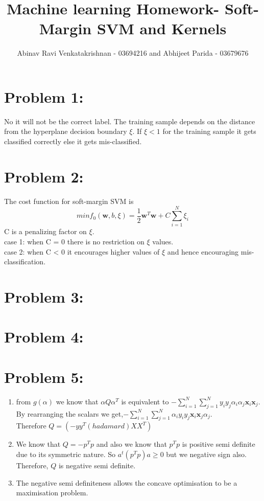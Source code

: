 \documentclass[5pt,a4paper]{article}
\begin{document}
	\title{Machine learning Homework- Soft-Margin SVM and Kernels }
	\author{Abinav Ravi Venkatakrishnan - 03694216 and Abhijeet Parida - 03679676}
	\maketitle
	\section*{Problem 1:}
	No it will not be the correct label. The training sample depends on the distance from the hyperplane decision boundary $\xi$. If $ \xi < 1 $ for the training sample it gets classified correctly else it gets mis-classified.
	
	\section*{Problem 2:}
	The cost function for soft-margin SVM is 
	\begin{equation}
	min f_0(\textbf{w},b,\xi) = \frac{1}{2}\textbf{w}^T \textbf{w}+ C \sum_{i=1}^{N} \xi_i
	\end{equation}
	C is a penalizing factor on $ \xi $. \\
	case 1: when C = 0 there is no restriction on $\xi$ values.\\
	case 2: when C < 0 it encourages higher values of $\xi$ and hence encouraging mis-classification.  
	\section*{Problem 3:}
	
	
	\section*{Problem 4:}
	
	\section*{Problem 5:}
	\begin{enumerate}
		\item from $g(\alpha)$ we know that $\alpha Q\alpha^T$ is equivalent to $-\sum_{i=1}^{N}\sum_{j=1}^{N} y_i y_j \alpha_i \alpha_j \textbf{x}_i \textbf{x}_j$. By rearranging the scalars we get,$-\sum_{i=1}^{N}\sum_{j=1}^{N}\alpha_i  y_i y_j  \textbf{x}_i \textbf{x}_j \alpha_j$. \\Therefore $Q= (-yy^T(hadamard)XX^T)$		\item We know that $Q=-p^Tp$ and also we know that $p^Tp$ is positive semi definite due to its symmetric nature. So $a^t (p^Tp)a \geq 0$ but we negative sign also. Therefore, $Q$ is negative semi definite.
		\item The negative semi definiteness allows the concave optimisation to be a maximisation problem. 
	\end{enumerate}
	
\end{document}

